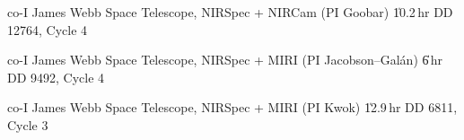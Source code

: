 \begin{cventries}





    

\cvsimpentry
    {co-I}
    {James Webb Space Telescope, NIRSpec + NIRCam (PI Goobar) \| 10.2\,hr}
    {DD 12764, Cycle 4}
    {}

\cvsimpentry
    {co-I}
    {James Webb Space Telescope, NIRSpec + MIRI (PI Jacobson--Gal{\'a}n) \| 6\,hr}
    {DD 9492, Cycle 4}
    {}

\cvsimpentry
    {co-I}
    {James Webb Space Telescope, NIRSpec + MIRI (PI Kwok) \| 12.9\,hr}
    {DD 6811, Cycle 3}
    {}







\end{cventries}